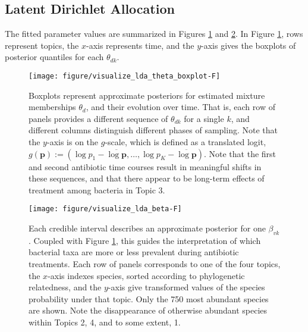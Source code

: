 \documentclass{article}
\begin{document}
\subsection{Latent Dirichlet Allocation}
\label{sec:antibiotics_lda}

The fitted parameter values are summarized in Figures
\ref{fig:antibiotics_lda_theta} and \ref{fig:antibiotics_lda_beta}.
In Figure \ref{fig:antibiotics_lda_theta}, rows represent topics, the $x$-axis
represents time, and the $y$-axis gives the boxplots of posterior quantiles for
each $\theta_{dk}$.

\begin{figure}[!p]
  \centering\texttt{[image: figure/visualize\_lda\_theta\_boxplot-F]}
  \caption{Boxplots represent approximate posteriors for estimated mixture
    memberships $\theta_{d}$, and their evolution over time. That is, each row
    of panels provides a different sequence of $\theta_{dk}$ for a single $k$,
    and different columns distinguish different phases of sampling. Note that
    the $y$-axis is on the $g$-scale, which is defined as a translated logit,
    $g\left(\mathbf{p}\right) := \left(\log p_{1} - \overline{\log \mathbf{p}},
    \dots,\log p_{K} - \overline{\log \mathbf{p}}\right)$. Note that the first
    and second antibiotic time courses result in meaningful shifts in these
    sequences, and that there appear to be long-term effects of treatment among
    bacteria in Topic 3. \label{fig:antibiotics_lda_theta}}
\end{figure}

\begin{figure}[!p]
  \centering\texttt{[image: figure/visualize\_lda\_beta-F]}
  \caption{Each credible interval describes an approximate posterior for one
    $\beta_{vk}$. Coupled with Figure \ref{fig:antibiotics_lda_theta}, this
    guides the interpretation of which bacterial taxa are more or less prevalent
    during antibiotic treatments. Each row of panels corresponds to one of the
    four topics, the $x$-axis indexes species, sorted according to phylogenetic
    relatedness, and the $y$-axis give transformed values of the species probability
    under that topic. Only the 750 most abundant species are shown. Note the
    disappearance of otherwise abundant species within Topics 2, 4, and to some
    extent, 1.} \label{fig:antibiotics_lda_beta}
\end{figure}
\end{document}
